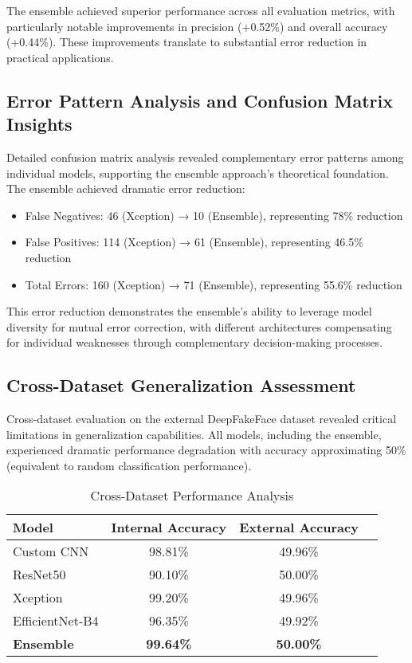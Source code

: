 \documentclass[conference]{IEEEtran}
\begin{document}
The ensemble achieved superior performance across all evaluation metrics, with particularly notable improvements in precision (+0.52\%) and overall accuracy (+0.44\%). These improvements translate to substantial error reduction in practical applications.

\subsection{Error Pattern Analysis and Confusion Matrix Insights}

Detailed confusion matrix analysis revealed complementary error patterns among individual models, supporting the ensemble approach's theoretical foundation. The ensemble achieved dramatic error reduction:

\begin{itemize}
\item False Negatives: 46 (Xception) → 10 (Ensemble), representing 78\% reduction
\item False Positives: 114 (Xception) → 61 (Ensemble), representing 46.5\% reduction
\item Total Errors: 160 (Xception) → 71 (Ensemble), representing 55.6\% reduction
\end{itemize}

This error reduction demonstrates the ensemble's ability to leverage model diversity for mutual error correction, with different architectures compensating for individual weaknesses through complementary decision-making processes.

\subsection{Cross-Dataset Generalization Assessment}

Cross-dataset evaluation on the external DeepFakeFace dataset revealed critical limitations in generalization capabilities. All models, including the ensemble, experienced dramatic performance degradation with accuracy approximating 50\% (equivalent to random classification performance).

\begin{table}[htbp]
\caption{Cross-Dataset Performance Analysis}
\begin{center}
\begin{tabular}{lccc}
\toprule
\textbf{Model} & \textbf{Internal Accuracy} & \textbf{External Accuracy}  \\
\midrule
Custom CNN & 98.81\% & 49.96\%  \\
ResNet50 & 90.10\% & 50.00\%  \\
Xception & 99.20\% & 49.96\%  \\
EfficientNet-B4 & 96.35\% & 49.92\%  \\
\textbf{Ensemble} & \textbf{99.64\%} & \textbf{50.00\%} &  \\
\bottomrule
\end{tabular}
\label{tab:cross_dataset}
\end{center}
\end{table}
\end{document}
